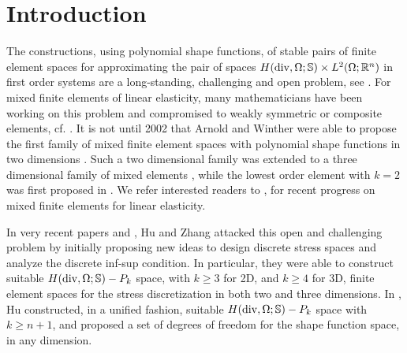 \documentclass{amsart}
\numberwithin{table}{section}
\numberwithin{figure}{section}
\begin{document}
\section{Introduction}
The constructions,  using polynomial shape functions,  of stable  pairs of finite element spaces for
approximating the pair of spaces $H(\operatorname{div},\Omega; \mathbb {S})\times L^2(\Omega; \mathbb{R}^n)$
 in first order
 systems  are  a long-standing, challenging and open problem, see \cite{Arnold2002,Arnold-Awanou-Winther}.
  For mixed finite elements of linear elasticity,
     many   mathematicians have been working on this problem and  compromised
    to weakly symmetric or composite elements,  cf.
    \cite{Amara-Thomas, Arnold-Brezzi-Douglas, Arnold-Douglas-Gupta,  Johnson-Mercier,
   Morley, Stenberg-1, Stenberg-2, Stenberg-3}.  It is not until  2002 that Arnold and Winther
    were able to propose the first family of mixed finite element spaces with polynomial shape  functions in two dimensions \cite{Arnold-Winther-conforming}.  Such a two dimensional  family was extended to
    a three dimensional family of mixed elements \cite{Arnold-Awanou-Winther}, while
       the lowest order element with $k=2$ was first proposed in \cite{Adams-Cockburn}.
We refer interested
        readers to \cite{Adams-Cockburn,Arnold-Awanou,Arnold-Awanou-Winther,
    Arnold-Winther-conforming,Awanou, Chen-Wang,
     Arnold-Winther-n, Gopalakrishnan-Guzman-n,Hu-Shi,
    Man-Hu-Shi, Yi-3D, Yi, Arnold-Falk-Winther,
    Boffi-Brezzi-Fortin, Cockburn-Gopalakrishnan-Guzman,
    Gopalakrishnan-Guzman, Guzman,Hu-Man-Zhang2014,Hu-Man-Zhang2013},  for recent progress on mixed finite elements
      for linear  elasticity.


In very recent papers \cite{Hu-Zhang2014a} and \cite{Hu-Zhang2014b},  Hu and Zhang
attacked this open and challenging  problem by  initially proposing   new ideas to design
 discrete stress spaces and analyze the discrete inf-sup condition. In particular, they were able
  to construct  suitable $H(\operatorname{div},\Omega;\mathbb {S})-P_k$ space, with $k\geq 3$ for 2D,
    and  $k\geq 4$ for 3D,   finite element spaces for the stress discretization in both two and three dimensions.
 In \cite{Hu2014}, Hu constructed,  in a unified fashion,  suitable $H(\operatorname{div},\Omega;\mathbb {S})-P_k$ space  with
      $k\geq n+1$, and  proposed a set of degrees of freedom for the shape function space, in any dimension.
\end{document}
